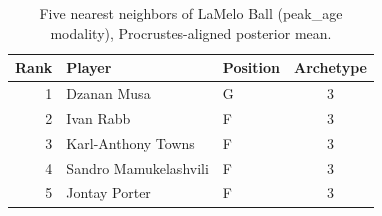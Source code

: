 \begin{table}[htbp]
  \centering\small
  \begin{tabular}{rllc}
    \toprule
    Rank & Player & Position & Archetype \\
    \midrule
    1 & Dzanan Musa & G & 3 \\
    2 & Ivan Rabb & F & 3 \\
    3 & Karl-Anthony Towns & F & 3 \\
    4 & Sandro Mamukelashvili & F & 3 \\
    5 & Jontay Porter & F & 3 \\
    \bottomrule
  \end{tabular}
  \caption{Five nearest neighbors of LaMelo Ball (peak_age modality), Procrustes-aligned posterior mean.}
  \label{tab:LaMelo_Ball_neighbors_peak_age}
\end{table}

